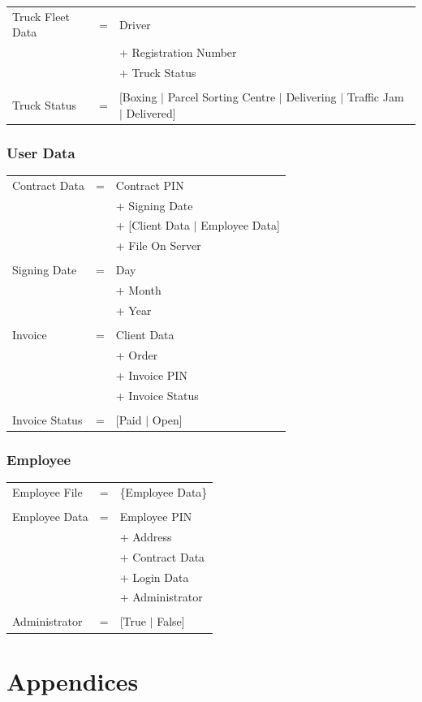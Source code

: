 \documentclass[11pt,a4paper,oneside,svgnames]{report}
\begin{document}
\begin{longtable}{p{3.5cm}p{0.5cm}p{8.5cm}}
Truck Fleet Data & = & Driver\\
&  & + Registration Number\\
&  & + Truck Status \\
\\
Truck Status & = & [Boxing $|$ Parcel Sorting Centre $|$ Delivering $|$ Traffic Jam $|$ Delivered] \\
\end{longtable}

\subsection{User Data}
\begin{longtable}{p{3.5cm}p{0.5cm}p{8.5cm}}
Contract Data & = & Contract PIN\\
& & + Signing Date\\
& & + [Client Data $|$ Employee Data]\\
& & + File On Server\\
\\
Signing Date & = & Day\\
&  & + Month\\
&  & + Year\\
\\
Invoice & = & Client Data\\
&  & + Order\\
&  & + Invoice PIN\\
&  & + Invoice Status\\
\\
Invoice Status & = & [Paid $|$ Open]\\
\end{longtable}

\subsection{Employee}

\begin{longtable}{p{3.5cm}p{0.5cm}p{8.5cm}}
Employee File & = & \{Employee Data\}\\
\\
Employee Data & = & Employee PIN\\
&  & + Address\\
&  & + Contract Data\\
&  & + Login Data\\
&  & + Administrator\\
\\
Administrator & = & [True $|$ False]
\end{longtable}


\chapter{Appendices}
\printglossaries
\end{document}
